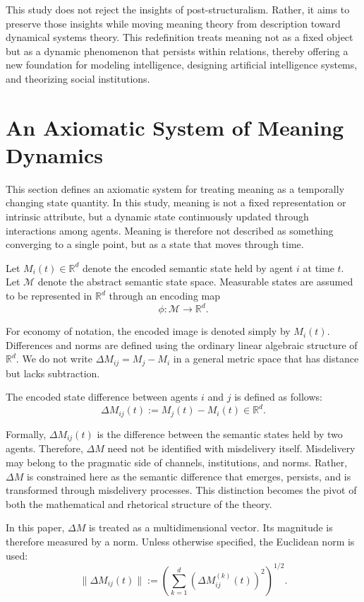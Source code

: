 \documentclass[11pt,a4paper]{article}
\theoremstyle{definition}
\begin{document}
This study does not reject the insights of post-structuralism. Rather, it aims to preserve those insights while moving meaning theory from description toward dynamical systems theory. This redefinition treats meaning not as a fixed object but as a dynamic phenomenon that persists within relations, thereby offering a new foundation for modeling intelligence, designing artificial intelligence systems, and theorizing social institutions.

\section{An Axiomatic System of Meaning Dynamics}

This section defines an axiomatic system for treating meaning as a temporally changing state quantity. In this study, meaning is not a fixed representation or intrinsic attribute, but a dynamic state continuously updated through interactions among agents. Meaning is therefore not described as something converging to a single point, but as a state that moves through time.

Let $M_i(t) \in \mathbb{R}^d$ denote the encoded semantic state held by agent $i$ at time $t$. Let $\mathcal{M}$ denote the abstract semantic state space. Measurable states are assumed to be represented in $\mathbb{R}^d$ through an encoding map
\[
\phi : \mathcal{M} \to \mathbb{R}^d.
\]

For economy of notation, the encoded image is denoted simply by $M_i(t)$. Differences and norms are defined using the ordinary linear algebraic structure of $\mathbb{R}^d$. We do not write $\Delta M_{ij} = M_j - M_i$ in a general metric space that has distance but lacks subtraction.

The encoded state difference between agents $i$ and $j$ is defined as follows:
\[
\Delta M_{ij}(t) := M_j(t) - M_i(t) \in \mathbb{R}^d.
\]

Formally, $\Delta M_{ij}(t)$ is the difference between the semantic states held by two agents. Therefore, $\Delta M$ need not be identified with misdelivery itself. Misdelivery may belong to the pragmatic side of channels, institutions, and norms. Rather, $\Delta M$ is constrained here as the semantic difference that emerges, persists, and is transformed through misdelivery processes. This distinction becomes the pivot of both the mathematical and rhetorical structure of the theory.

In this paper, $\Delta M$ is treated as a multidimensional vector. Its magnitude is therefore measured by a norm. Unless otherwise specified, the Euclidean norm is used:
\[
\|\Delta M_{ij}(t)\| := \left(\sum_{k=1}^{d} (\Delta M^{(k)}_{ij}(t))^2\right)^{1/2}.
\]
\end{document}
